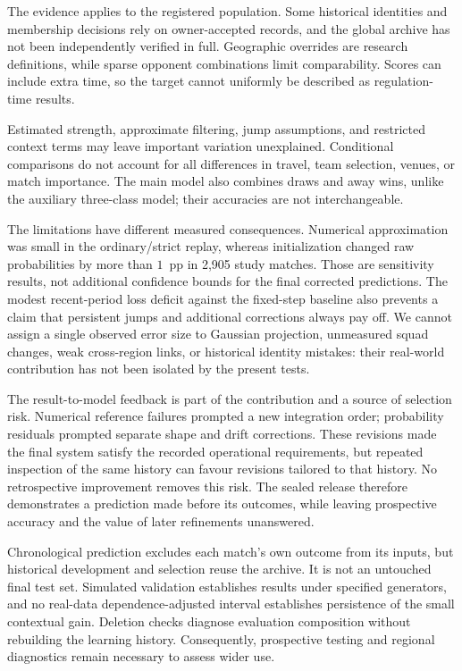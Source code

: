 The evidence applies to the registered population. Some historical identities and membership decisions rely on owner-accepted records, and the global archive has not been independently verified in full. Geographic overrides are research definitions, while sparse opponent combinations limit comparability. Scores can include extra time, so the target cannot uniformly be described as regulation-time results.

Estimated strength, approximate filtering, jump assumptions, and restricted context terms may leave important variation unexplained. Conditional comparisons do not account for all differences in travel, team selection, venues, or match importance. The main model also combines draws and away wins, unlike the auxiliary three-class model; their accuracies are not interchangeable.

The limitations have different measured consequences. Numerical approximation was small in the ordinary/strict replay, whereas initialization changed raw probabilities by more than $1$~pp in 2,905 study matches. Those are sensitivity results, not additional confidence bounds for the final corrected predictions. The modest recent-period loss deficit against the fixed-step baseline also prevents a claim that persistent jumps and additional corrections always pay off. We cannot assign a single observed error size to Gaussian projection, unmeasured squad changes, weak cross-region links, or historical identity mistakes: their real-world contribution has not been isolated by the present tests.

The result-to-model feedback is part of the contribution and a source of selection risk. Numerical reference failures prompted a new integration order; probability residuals prompted separate shape and drift corrections. These revisions made the final system satisfy the recorded operational requirements, but repeated inspection of the same history can favour revisions tailored to that history. No retrospective improvement removes this risk. The sealed release therefore demonstrates a prediction made before its outcomes, while leaving prospective accuracy and the value of later refinements unanswered.

Chronological prediction excludes each match's own outcome from its inputs, but historical development and selection reuse the archive. It is not an untouched final test set. Simulated validation establishes results under specified generators, and no real-data dependence-adjusted interval establishes persistence of the small contextual gain. Deletion checks diagnose evaluation composition without rebuilding the learning history. Consequently, prospective testing and regional diagnostics remain necessary to assess wider use.

